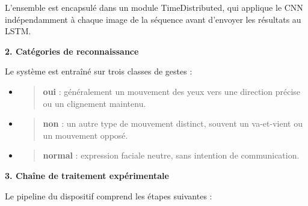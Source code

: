 \documentclass[
]{article}
\begin{document}
L'ensemble est encapsulé dans un module TimeDistributed, qui applique le CNN indépendamment à chaque image de la séquence avant d'envoyer les résultats au LSTM.

\textbf{2. Catégories de reconnaissance}

Le système est entraîné sur trois classes de gestes :

\begin{itemize}
\item
  \begin{quote}
  \textbf{oui} : généralement un mouvement des yeux vers une direction précise ou un clignement maintenu.
  \end{quote}
\item
  \begin{quote}
  \textbf{non} : un autre type de mouvement distinct, souvent un va-et-vient ou un mouvement opposé.
  \end{quote}
\item
  \begin{quote}
  \textbf{normal} : expression faciale neutre, sans intention de communication.
  \end{quote}
\end{itemize}

\textbf{3. Chaîne de traitement expérimentale}

Le pipeline du dispositif comprend les étapes suivantes :
\end{document}
